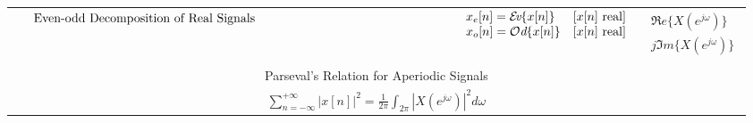 \documentclass[12pt]{article}
\numberwithin{equation}{section}
\newcommand{\Ev}{\mbox{$\cal E\!$\it v}}
\newcommand{\Od}{\mbox{$\cal O$\it d}}
\begin{document}
\begin{table}[htb]
\begin{center}
\begin{tabular}{p{2.0in}ll}
   $\vcenter{Even-odd Decomposition of Real Signals}$
  & $\begin{array}{ll}
      \displaystyle x_{e}[n] = \Ev \{x[n]\} & [x[n]\ {\rm real}] \\
      \displaystyle x_{o}[n] = \Od \{x[n]\} & [x[n]\ {\rm real}]
    \end{array}$
  & $\begin{array}{l}
      \displaystyle \Re e\{X(e^{j\omega})\} \\
      \displaystyle j\Im m\{X(e^{j\omega})\}
    \end{array}$
  \\
& & \\
   \multicolumn{3}{c}{Parseval's Relation for Aperiodic Signals} \\
  \multicolumn{3}{c}{$\displaystyle
    \sum^{+\infty}_{n=-\infty} |x[n]|^{2}= \frac{1}{2\pi} \int_{2\pi}
    |X(e^{j\omega})|^{2} d\omega$} \\
\end{tabular}
\end{center}
\end{table}
\clearpage

%
%
\end{document}
